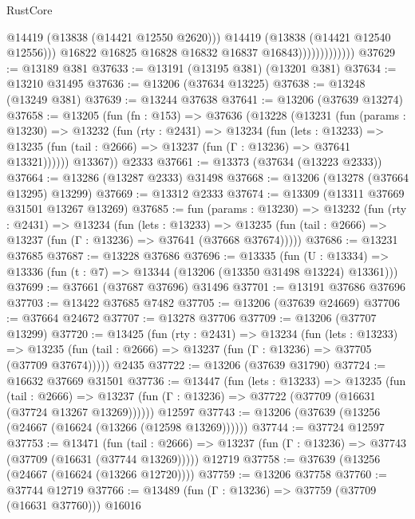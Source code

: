 \begin{lexlean}{RustCore}
\begin{coremodule}
                                  @14419
                                  (@13838 (@14421 @12550 @2620)))
                                @14419
                                (@13838 (@14421 @12540 @12556)))
                              @16822
                              @16825
                              @16828
                              @16832
                              @16837
                              @16843)))))))))))))
@37629 := @13189 @381
@37633 := @13191 (@13195 @381) (@13201 @381)
@37634 := @13210 @31495
@37636 := @13206 (@37634 @13225)
@37638 := @13248 (@13249 @381)
@37639 := @13244 @37638
@37641 := @13206 (@37639 @13274)
@37658 := @13205
    (fun (fn : @153) =>
    @37636
      (@13228
        (@13231
          (fun (params : @13230) =>
          @13232
            (fun (rty : @2431) =>
            @13234
              (fun (lets : @13233) =>
              @13235 (fun (tail : @2666) => @13237 (fun (Γ : @13236) => @37641 @13321))))))
        @13367))
    @2333
@37661 := @13373 (@37634 (@13223 @2333))
@37664 := @13286 (@13287 @2333) @31498
@37668 := @13206 (@13278 (@37664 @13295) @13299)
@37669 := @13312 @2333
@37674 := @13309 (@13311 @37669 @31501 @13267 @13269)
@37685 := fun (params : @13230) =>
  @13232
    (fun (rty : @2431) =>
    @13234
      (fun (lets : @13233) =>
      @13235 (fun (tail : @2666) => @13237 (fun (Γ : @13236) => @37641 (@37668 @37674)))))
@37686 := @13231 @37685
@37687 := @13228 @37686
@37696 := @13335
    (fun (U : @13334) => @13336 (fun (t : @7) => @13344 (@13206 (@13350 @31498 @13224) @13361)))
@37699 := @37661 (@37687 @37696) @31496
@37701 := @13191 @37686 @37696
@37703 := @13422 @37685 @7482
@37705 := @13206 (@37639 @24669)
@37706 := @37664 @24672
@37707 := @13278 @37706
@37709 := @13206 (@37707 @13299)
@37720 := @13425
    (fun (rty : @2431) =>
    @13234
      (fun (lets : @13233) =>
      @13235 (fun (tail : @2666) => @13237 (fun (Γ : @13236) => @37705 (@37709 @37674)))))
    @2435
@37722 := @13206 (@37639 @31790)
@37724 := @16632 @37669 @31501
@37736 := @13447
    (fun (lets : @13233) =>
    @13235
      (fun (tail : @2666) =>
      @13237 (fun (Γ : @13236) => @37722 (@37709 (@16631 (@37724 @13267 @13269))))))
    @12597
@37743 := @13206 (@37639 (@13256 (@24667 (@16624 (@13266 (@12598 @13269))))))
@37744 := @37724 @12597
@37753 := @13471
    (fun (tail : @2666) => @13237 (fun (Γ : @13236) => @37743 (@37709 (@16631 (@37744 @13269)))))
    @12719
@37758 := @37639 (@13256 (@24667 (@16624 (@13266 @12720))))
@37759 := @13206 @37758
@37760 := @37744 @12719
@37766 := @13489 (fun (Γ : @13236) => @37759 (@37709 (@16631 @37760))) @16016

\end{coremodule}
\end{lexlean}
